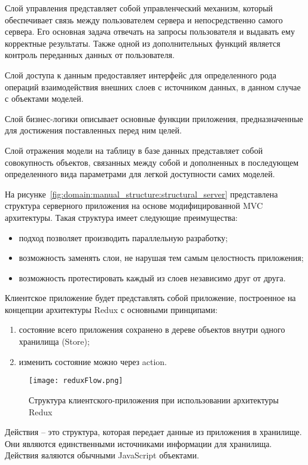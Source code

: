 Слой управления представляет собой управленческий механизм, который обеспечивает связь между пользователем сервера и непосредственно самого сервера. Его основная задача отвечать на запросы пользователя и выдавать ему корректные результаты. Также одной из дополнительных функций является контроль переданных данных от пользователя.

Слой доступа к данным предоставляет интерфейс для определенного рода операций взаимодействия внешних слоев с источником данных, в данном случае с объектами моделей.

Слой бизнес-логики описывает основные функции приложения, предназначенные для достижения поставленных перед ним целей.

Слой отражения модели на таблицу в базе данных представляет собой совокупность объектов, связанных между собой и дополненных в последующем определенного вида параметрами для легкой доступности самих моделей.

На рисунке~\ref{fig:domain:manual_structure:structural_server} представлена структура серверного приложения на основе модифицированной MVC архитектуры. Такая структура имеет следующие преимущества:
\begin{itemize}
  \item подход позволяет производить параллельную разработку;
  \item возможность заменять слои, не нарушая тем самым целостность приложения;
  \item возможность протестировать каждый из слоев независимо друг от друга.
\end{itemize}

Клиентское приложение будет представлять собой приложение, построенное на концепции архитектуры Redux с основными принципами:
\begin{enumerate}
  \item состояние всего приложения сохранено в дереве объектов внутри одного хранилища (Store);
  \item изменить состояние можно через action.
\end{enumerate}

\begin{figure}[ht]
\centering
  \texttt{[image: reduxFlow.png]}  
  \caption{Структура клиентского-приложения при использовании архитектуры Redux}
  \label{fig:domain:manual_structure:structural_client}
\end{figure}

Действия -- это структура, которая передает данные из приложения в хранилище. Они являются единственными источниками информации для хранилища. Действия яаляются обычными JavaScript объектами.

